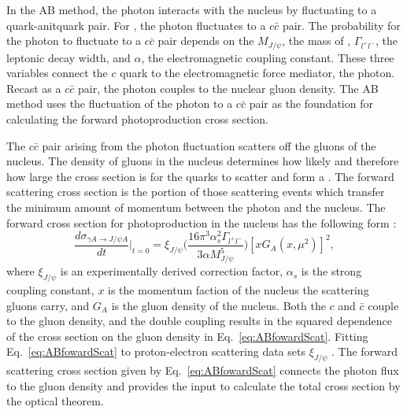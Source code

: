     In the AB method, the photon interacts with the nucleus by fluctuating to 
      a quark-anitquark pair.
    For \JPsi{}, the photon fluctuates to a $c\bar{c}$ pair. 
    The probability for the photon to fluctuate to a $c\bar{c}$ pair
      depends on the $M_{J/\psi}$, the mass of \JPsi{}, $\Gamma_{l^{+}l^{-}}$, 
      the \JPsi{} leptonic decay width, and $\alpha$, the electromagnetic 
      coupling constant.
    These three variables connect the $c$ quark to the electromagnetic force 
      mediator, the photon. 
    Recast as a $c\bar{c}$ pair, the photon couples to the nuclear gluon 
      density.
    The AB method uses the fluctuation of the photon to a $c\bar{c}$ 
      pair as the foundation for calculating the forward \JPsi{} 
      photoproduction cross section. 

    The $c\bar{c}$ pair arising from the photon fluctuation scatters off the 
      gluons of the nucleus. 
    The density of gluons in the nucleus determines how likely and therefore 
      how large the cross section is for the quarks to scatter and form a 
      \JPsi{}.
    The forward scattering cross section is the portion of those scattering 
      events which transfer the minimum amount of momentum between the 
      photon and the nucleus. 
    The forward cross section for \JPsi{} photoproduction in the nucleus has 
      the following form \cite{pQCD2011.08}:
    \begin{equation} \label{eq:ABfowardScat}
      \frac{d\sigma_{\gamma A\rightarrow J/\psi A}}{dt}\Big|_{t=0}=\xi_{J/\psi}
        \Big(\frac{16\pi^{3}\alpha_{s}^{2}\Gamma_{l^{+}l^{-}}}{3\alpha 
        M_{J/\psi}^{5}}\Big)[xG_{A}(x,\mu^{2})]^{2},
    \end{equation}
      where $\xi_{J/\psi}$ is an experimentally derived 
      correction factor, $\alpha_{s}$ is the strong coupling constant, $x$ is 
      the momentum faction of the nucleus the scattering gluons carry, and 
      $G_{A}$ is the gluon density of the nucleus. 
    Both the $c$ and $\bar{c}$ couple to the gluon density, and the double 
      coupling results in the squared dependence of the cross section on the 
      gluon density in Eq.~\ref{eq:ABfowardScat}. 
    Fitting Eq.~\ref{eq:ABfowardScat} to proton-electron scattering data 
      sets $\xi_{J/\psi}$ \cite{pQCD2011.08}.
    The forward scattering cross section given by Eq.~\ref{eq:ABfowardScat} 
      connects the photon flux to the gluon density and provides the input to 
      calculate the total cross section by the optical theorem. 
    
